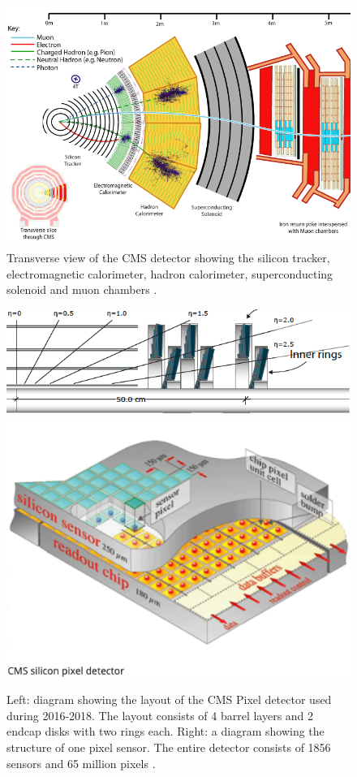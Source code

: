 \documentclass[final,12p]{article}
\begin{document}
\begin{figure}[H]
  \centering
  \includegraphics[width=0.65\columnwidth]{./cms12.png}
  \caption{Transverse view of the CMS detector showing the silicon tracker, electromagnetic calorimeter, hadron calorimeter, superconducting solenoid and muon chambers \cite{Chatrchyan:2008aa}.}
  \label{fig:CMS}
\end{figure}


\begin{figure}[H]
  \centering
  \includegraphics[width=0.7\columnwidth]{./PixelDetectorPhase1.png}
  \includegraphics[width=0.27\columnwidth]{./PixelSensor.png}
  \caption{
    Left: diagram showing the layout of the CMS Pixel detector used during 2016-2018.
    The layout consists of 4 barrel layers and 2 endcap disks with two rings each.
    Right: a diagram showing the structure of one pixel sensor.
    The entire detector consists of 1856 sensors and 65 million pixels \cite{TrackerGroupoftheCMS:2020bgg}.
  }
  \label{fig:pixeldet}
\end{figure}
\end{document}
